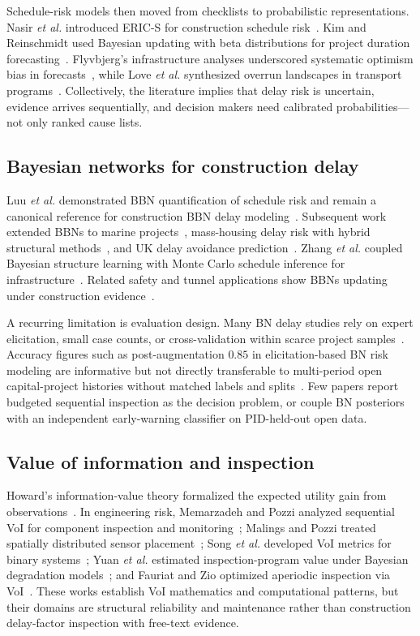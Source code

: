\documentclass[journal]{IEEEtran}
\begin{document}
Schedule-risk models then moved from checklists to probabilistic representations. Nasir \textit{et al.} introduced ERIC-S for construction schedule risk~\cite{Nasir2003}. Kim and Reinschmidt used Bayesian updating with beta distributions for project duration forecasting~\cite{Kim2016}. Flyvbjerg's infrastructure analyses underscored systematic optimism bias in forecasts~\cite{Flyvbjerg2009}, while Love \textit{et al.} synthesized overrun landscapes in transport programs~\cite{Love2015}. Collectively, the literature implies that delay risk is uncertain, evidence arrives sequentially, and decision makers need calibrated probabilities---not only ranked cause lists.

\subsection{Bayesian networks for construction delay}
Luu \textit{et al.} demonstrated BBN quantification of schedule risk and remain a canonical reference for construction BBN delay modeling~\cite{Luu2009}. Subsequent work extended BBNs to marine projects~\cite{Comu2023}, mass-housing delay risk with hybrid structural methods~\cite{Khodabakhshian2025}, and UK delay avoidance prediction~\cite{Ji2021}. Zhang \textit{et al.} coupled Bayesian structure learning with Monte Carlo schedule inference for infrastructure~\cite{Zhang2021BNMCS}. Related safety and tunnel applications show BBNs updating under construction evidence~\cite{Wu2015,Wang2016,Leu2012}.

A recurring limitation is evaluation design. Many BN delay studies rely on expert elicitation, small case counts, or cross-validation within scarce project samples~\cite{Khodabakhshian2025}. Accuracy figures such as post-augmentation $0.85$ in elicitation-based BN risk modeling are informative but not directly transferable to multi-period open capital-project histories without matched labels and splits~\cite{Khodabakhshian2025}. Few papers report budgeted sequential inspection as the decision problem, or couple BN posteriors with an independent early-warning classifier on PID-held-out open data.

\subsection{Value of information and inspection}
Howard's information-value theory formalized the expected utility gain from observations~\cite{Howard1966}. In engineering risk, Memarzadeh and Pozzi analyzed sequential VoI for component inspection and monitoring~\cite{Memarzadeh2016}; Malings and Pozzi treated spatially distributed sensor placement~\cite{Malings2016}; Song \textit{et al.} developed VoI metrics for binary systems~\cite{Song2021}; Yuan \textit{et al.} estimated inspection-program value under Bayesian degradation models~\cite{Yuan2021}; and Fauriat and Zio optimized aperiodic inspection via VoI~\cite{Fauriat2020}. These works establish VoI mathematics and computational patterns, but their domains are structural reliability and maintenance rather than construction delay-factor inspection with free-text evidence.
\end{document}
